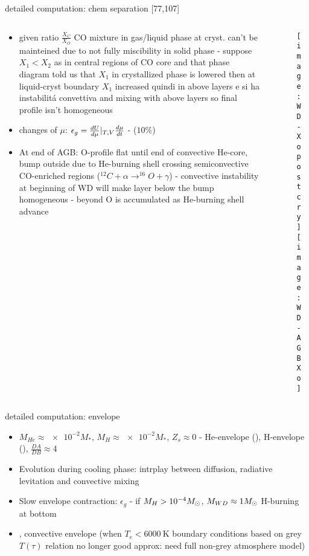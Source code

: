 \begin{frame}{detailed computation: chem separation [77,107]}
\begin{columns}[T]
	\begin{column}{0.45\textwidth}
		\begin{itemize}
			\item given ratio $\frac{X_C}{X_O}$ CO mixture in gas/liquid phase at cryst. can't be mainteined due to not fully miscibility in solid phase - suppose $X_1<X_2$ as in central regions of CO core and that phase diagram told us that $X_1$ in crystallized phase is lowered then at liquid-cryst boundary $X_1$ increased quindi \xdiminuisce{\mu} in above layers e si ha instabilit\'a convettiva and mixing with above layers so final profile isn't homogeneous
			\item changes of $\mu$: $\epsilon_g=\frac{d U}{d \mu}|_{T,V}\frac{d \mu}{d t}$ - ($10\%$)
			\item At end of AGB: O-profile flat until end of convective He-core, bump outside due to He-burning shell crossing semiconvective CO-enriched regions ($^{12}C+\alpha\to^{16}O+\gamma$) - convective instability at beginning of WD will make layer below the bump homogeneous - beyond O is accumulated as He-burning shell advance
		\end{itemize}
	\end{column}
	\begin{column}{0.50\textwidth}
		\begin{figure}[!ht]
		\texttt{[image: WD-Xopostcry]}\label{fig:WD-Xopostcry}
		\texttt{[image: WD-AGBXo]}\label{fig:WD-AGBXo}
		\end{figure}
\end{column}\end{columns}
\end{frame}

\begin{frame}{detailed computation: envelope}
	\begin{itemize}
			\item $M_{He}\approx\num{e-2}M_*$, $M_H\approx\num{e-2}M_*$, $Z_s\approx0$ - He-envelope (), H-envelope (), $\frac{DA}{DB}\approx4$
			\item Evolution during cooling phase: intrplay between diffusion, radiative levitation and convective mixing
			\item Slow envelope contraction: $\epsilon_g$ - if $M_H>\num{e-4}M_{\odot}$, $M_{WD}\approx1M_{\odot}$ H-burning at bottom
			\item {}, convective envelope (when $T_e<\SI{6000}{\kelvin}$ boundary conditions based on grey $T(\tau)$ relation no longer good approx: need full non-grey atmosphere model)
	\end{itemize}
\end{frame}

